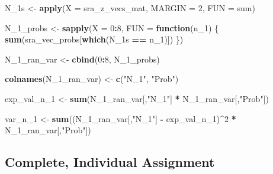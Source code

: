\documentclass[12pt,leqno]{article}
\newenvironment{Shaded}{\begin{snugshade}}{\end{snugshade}}
\newcommand{\ControlFlowTok}[1]{\textcolor[rgb]{0.13,0.29,0.53}{\textbf{#1}}}
\newcommand{\DataTypeTok}[1]{\textcolor[rgb]{0.13,0.29,0.53}{#1}}
\newcommand{\DecValTok}[1]{\textcolor[rgb]{0.00,0.00,0.81}{#1}}
\newcommand{\KeywordTok}[1]{\textcolor[rgb]{0.13,0.29,0.53}{\textbf{#1}}}
\newcommand{\NormalTok}[1]{#1}
\newcommand{\OperatorTok}[1]{\textcolor[rgb]{0.81,0.36,0.00}{\textbf{#1}}}
\newcommand{\StringTok}[1]{\textcolor[rgb]{0.31,0.60,0.02}{#1}}
\theoremstyle{newstyle}
\begin{document}
\begin{Shaded}
\begin{Highlighting}[]
\NormalTok{N_1s <-}\StringTok{ }\KeywordTok{apply}\NormalTok{(}\DataTypeTok{X =}\NormalTok{ sra_z_vecs_mat,}
              \DataTypeTok{MARGIN =} \DecValTok{2}\NormalTok{,}
              \DataTypeTok{FUN =}\NormalTok{ sum)}

\NormalTok{N_}\DecValTok{1}\NormalTok{_probs <-}\StringTok{ }\KeywordTok{sapply}\NormalTok{(}\DataTypeTok{X =} \DecValTok{0}\OperatorTok{:}\DecValTok{8}\NormalTok{,}
                    \DataTypeTok{FUN =} \ControlFlowTok{function}\NormalTok{(n_}\DecValTok{1}\NormalTok{) \{ }\KeywordTok{sum}\NormalTok{(sra_vec_probs[}\KeywordTok{which}\NormalTok{(N_1s }\OperatorTok{==}\StringTok{ }\NormalTok{n_}\DecValTok{1}\NormalTok{)])  \})}

\NormalTok{N_}\DecValTok{1}\NormalTok{_ran_var <-}\StringTok{ }\KeywordTok{cbind}\NormalTok{(}\DecValTok{0}\OperatorTok{:}\DecValTok{8}\NormalTok{, N_}\DecValTok{1}\NormalTok{_probs)}

\KeywordTok{colnames}\NormalTok{(N_}\DecValTok{1}\NormalTok{_ran_var) <-}\StringTok{ }\KeywordTok{c}\NormalTok{(}\StringTok{"N_1"}\NormalTok{, }\StringTok{"Prob"}\NormalTok{)}
\end{Highlighting}
\end{Shaded}

\begin{Shaded}
\begin{Highlighting}[]
\NormalTok{exp_val_n_}\DecValTok{1}\NormalTok{ <-}\StringTok{ }\KeywordTok{sum}\NormalTok{(N_}\DecValTok{1}\NormalTok{_ran_var[,}\StringTok{"N_1"}\NormalTok{] }\OperatorTok{*}\StringTok{ }\NormalTok{N_}\DecValTok{1}\NormalTok{_ran_var[,}\StringTok{"Prob"}\NormalTok{])}

\NormalTok{var_n_}\DecValTok{1}\NormalTok{ <-}\StringTok{ }\KeywordTok{sum}\NormalTok{((N_}\DecValTok{1}\NormalTok{_ran_var[,}\StringTok{"N_1"}\NormalTok{] }\OperatorTok{-}\StringTok{ }\NormalTok{exp_val_n_}\DecValTok{1}\NormalTok{)}\OperatorTok{^}\DecValTok{2} \OperatorTok{*}\StringTok{ }\NormalTok{N_}\DecValTok{1}\NormalTok{_ran_var[,}\StringTok{"Prob"}\NormalTok{])}
\end{Highlighting}
\end{Shaded}

\hypertarget{complete-individual-assignment}{%
\subsection{Complete, Individual
Assignment}\label{complete-individual-assignment}}
\end{document}
